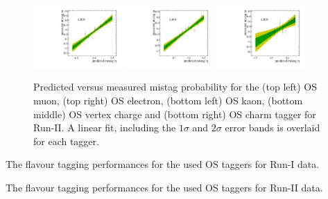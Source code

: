 \begin{figure}[h]
\includegraphics[height=!,width=0.3\textwidth]{figs/Tagging/Run2/OS_nnetKaon_Calibration.pdf}
\includegraphics[height=!,width=0.3\textwidth]{figs/Tagging/Run2/VtxCharge_Calibration.pdf}
\includegraphics[height=!,width=0.3\textwidth]{figs/Tagging/Run2/OS_Charm_Calibration.pdf}
\caption{\small Predicted versus measured mistag probability for the (top left) OS muon, (top right) OS electron, (bottom left) OS kaon, (bottom middle) OS vertex charge
and (bottom right) OS charm tagger for Run-II. 
A linear fit, including the $1\sigma$ and $2\sigma$ error bands is overlaid for each tagger.}
\label{fig:OSdistribution_Run2}
\end{figure}

\clearpage
\begin{table}[h]
\centering
\caption{The flavour tagging performances for the used OS taggers for Run-I data.}
\resizebox{\linewidth}{!}{
	
}
\label{tab:OS_Run1}
%
\caption{The flavour tagging performances for the used OS taggers for Run-II data.}
\resizebox{\linewidth}{!}{
	
}
\label{tab:OS_Run2}
\end{table}



